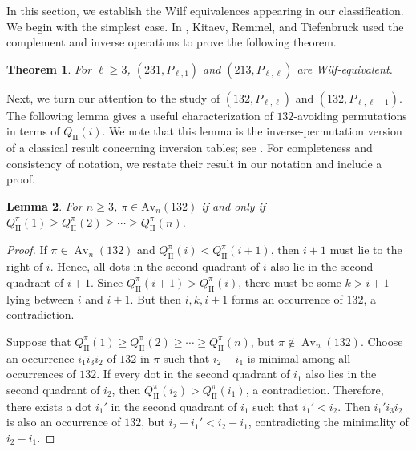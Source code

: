 \documentclass[11pt]{article}
\newtheorem{thm}{Theorem}[section]
\newtheorem{lem}[thm]{Lemma}
\begin{document}
In this section, we establish the Wilf equivalences appearing in our
classification. 
We begin with the simplest case. In \cite{KitaevRemmelTiefenbruckI}, 
Kitaev, Remmel, and Tiefenbruck used the complement and inverse operations to prove the following theorem.
\begin{thm}\label{231,Pl1}
For $\ell\geq 3$, $(231,P_{\ell,1})$ and $(213,P_{\ell,\ell})$ are Wilf-equivalent.
\end{thm}

Next, we turn our attention to the study of
$(132,P_{\ell,\ell})$ and $(132,P_{\ell,\ell-1})$. 
The following lemma gives a useful characterization of $132$-avoiding permutations in terms of 
$Q_{\mathrm{II}}(i)$.
We note that this lemma is the inverse-permutation version of
a classical result concerning inversion tables; see
\cite[Lemma 10]{ClaessonJelinekSteingrimsson2012}.
For completeness and consistency of notation, we restate their result
in our notation and include a proof.

\begin{lem}\label{lem:132-quadrant}
For $n\geq 3$, $\pi\in\text{Av}_n(132)$ if and only if $Q^\pi_{\mathrm{II}}(1)\ge Q^\pi_{\mathrm{II}}(2)\ge\cdots\ge Q^\pi_{\mathrm{II}}(n)$.
\end{lem}

\begin{proof}
If $\pi\in\operatorname{Av}_n(132)$ and
$Q^\pi_{\mathrm{II}}(i)<Q^\pi_{\mathrm{II}}(i+1)$, then $i+1$ must lie
to the right of $i$. Hence, all dots in the second quadrant of $i$ also lie
in the second quadrant of $i+1$. Since
$Q^\pi_{\mathrm{II}}(i+1)>Q^\pi_{\mathrm{II}}(i)$, there must be some
$k>i+1$ lying between $i$ and $i+1$. But then $i,k,i+1$ forms an occurrence
of $132$, a contradiction.

Suppose that $Q^\pi_{\mathrm{II}}(1)\geq Q^\pi_{\mathrm{II}}(2)\geq\cdots\geq
Q^\pi_{\mathrm{II}}(n)$, but $\pi\notin\operatorname{Av}_n(132)$. Choose an occurrence
$i_1i_3i_2$ of $132$ in $\pi$ such that $i_2-i_1$ is minimal among all
occurrences of $132$. If every dot in the second quadrant of $i_1$ also
lies in the second quadrant of $i_2$, then
$Q^\pi_{\mathrm{II}}(i_2)>Q^\pi_{\mathrm{II}}(i_1)$, a contradiction.
Therefore, there exists a dot $i_1'$ in the second quadrant of $i_1$ such
that $i_1'<i_2$. Then $i_1'i_3i_2$ is also an occurrence of $132$, but
$i_2-i_1'<i_2-i_1$,
contradicting the minimality of $i_2-i_1$.
\end{proof}

\end{document}
